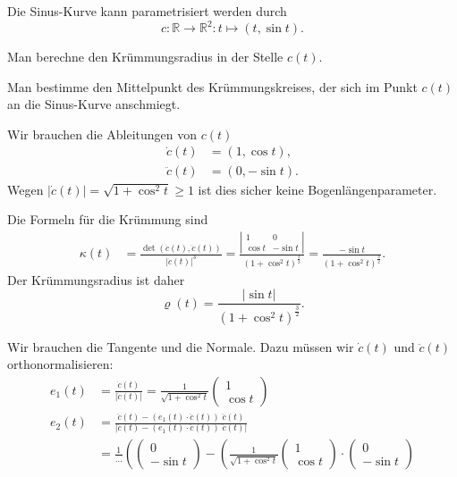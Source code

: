 Die Sinus-Kurve kann parametrisiert werden durch
\[
c\colon \mathbb R\to \mathbb R^2 : t\mapsto (t,\sin t).
\]
\begin{teilaufgaben}
\item
Man berechne den Krümmungsradius in der Stelle $c(t)$.
\item
Man bestimme den Mittelpunkt des Krümmungskreises, der sich im Punkt $c(t)$
an die Sinus-Kurve anschmiegt.
\end{teilaufgaben}


\begin{loesung}
Wir brauchen die Ableitungen von $c(t)$
\begin{align*}
\dot c(t)
&=
(1,\cos t),
\\
\ddot c(t)
&=
(0,-\sin t).
\end{align*}
Wegen $|\dot c(t)|=\sqrt{1+\cos^2t}\ge 1$ ist dies sicher keine Bogenlängenparameter.
\begin{teilaufgaben}
\item
Die Formeln für die Krümmung sind
\begin{align*}
\kappa(t)
&=
\frac{\det(\dot c(t),\ddot c(t))}{|\dot c(t)|^3}
=
\frac{\left|\begin{matrix}1&0\\\cos t&-\sin t\end{matrix}\right|}{(1+\cos^2t)^\frac32}
=
\frac{-\sin t}{(1+\cos^2t)^\frac32}.
\end{align*}
Der Krümmungsradius ist daher
\[
\varrho(t)
=
\frac{|\sin t|}{(1+\cos^2t)^\frac32}.
\]
\item
Wir brauchen die Tangente und die Normale.
Dazu müssen wir $\dot c(t)$ und $\ddot c(t)$ orthonormalisieren:
\begin{align*}
e_1(t)
&=
\frac{\dot c(t)}{|\dot c(t)|}
=
\frac1{\sqrt{1+\cos^2t}}
\begin{pmatrix}1\\ \cos t\end{pmatrix}
\\
e_2(t)
&=
\frac{\ddot c(t) - (e_1(t)\cdot \ddot c(t))\;\ddot c(t)}{|\ddot c(t) - (e_1(t)\cdot \ddot c(t))\;\ddot c(t)|}
\\
&=
\frac{1}{\dots}\left(
\begin{pmatrix}0\\-\sin t\end{pmatrix}
-
\left(
\frac{1}{\sqrt{1+\cos^2t}}
\begin{pmatrix}1\\\cos t\end{pmatrix}
\cdot
\begin{pmatrix}0\\-\sin t\end{pmatrix}

\end{align*}
\end{teilaufgaben}
\end{loesung}
